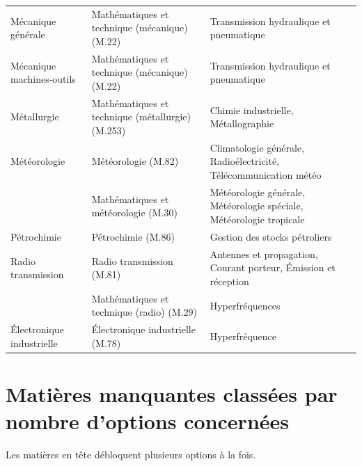 \documentclass[11pt,a4paper]{article}
\begin{document}
\begin{longtable}{@{}>{\raggedright\arraybackslash}p{3.4cm}>{\raggedright\arraybackslash}p{4.4cm}>{\raggedright\arraybackslash}p{7.4cm}@{}}
Mécanique générale & Mathématiques et technique (mécanique) (M.22) & Transmission hydraulique et pneumatique\\
Mécanique machines-outils & Mathématiques et technique (mécanique) (M.22) & Transmission hydraulique et pneumatique\\
Métallurgie & Mathématiques et technique (métallurgie) (M.253) & Chimie industrielle, Métallographie\\
Météorologie & Météorologie (M.82) & Climatologie générale, Radioélectricité, Télécommunication météo\\
 & Mathématiques et météorologie (M.30) & Météorologie générale, Météorologie spéciale, Météorologie tropicale\\
Pétrochimie & Pétrochimie (M.86) & Gestion des stocks pétroliers\\
Radio transmission & Radio transmission (M.81) & Antennes et propagation, Courant porteur, Émission et réception\\
 & Mathématiques et technique (radio) (M.29) & Hyperfréquences\\
Électronique industrielle & Électronique industrielle (M.78) & Hyperfréquence\\
\bottomrule
\end{longtable}

\section{Matières manquantes classées par nombre d'options concernées}
Les matières en tête débloquent plusieurs options à la fois.
\end{document}
